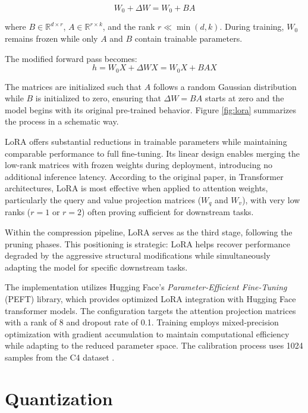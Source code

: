 \begin{equation}
W_0 + \Delta W = W_0 + BA
\end{equation}

where $B \in \mathbb{R}^{d \times r}$, $A \in \mathbb{R}^{r \times k}$, and the rank $r \ll \min(d,k)$. During training, $W_0$ remains frozen while only $A$ and $B$ contain trainable parameters.

The modified forward pass becomes:
\begin{equation}
h = W_0X + \Delta WX = W_0X + BAX
\end{equation}

The matrices are initialized such that $A$ follows a random Gaussian distribution while $B$ is initialized to zero, ensuring that $\Delta W = BA$ starts at zero and the model begins with its original pre-trained behavior. Figure \ref{fig:lora} summarizes the process in a schematic way.

LoRA offers substantial reductions in trainable parameters while maintaining comparable performance to full fine-tuning. Its linear design enables merging the low-rank matrices with frozen weights during deployment, introducing no additional inference latency. According to the original paper, in Transformer architectures, LoRA is most effective when applied to attention weights, particularly the query and value projection matrices ($W_q$ and $W_v$), with very low ranks ($r=1$ or $r=2$) often proving sufficient for downstream tasks.

Within the compression pipeline, LoRA serves as the third stage, following the pruning phases. This positioning is strategic: LoRA helps recover performance degraded by the aggressive structural modifications while simultaneously adapting the model for specific downstream tasks.

The implementation utilizes Hugging Face's \textit{Parameter-Efficient Fine-Tuning} (PEFT) \cite{peft} library, which provides optimized LoRA integration with Hugging Face transformer models. The configuration targets the attention projection matrices with a rank of 8 and dropout rate of 0.1. Training employs mixed-precision optimization with gradient accumulation to maintain computational efficiency while adapting to the reduced parameter space. The calibration process uses 1024 samples from the C4 dataset \cite{c4}.

\section{Quantization} \label{quantization}

